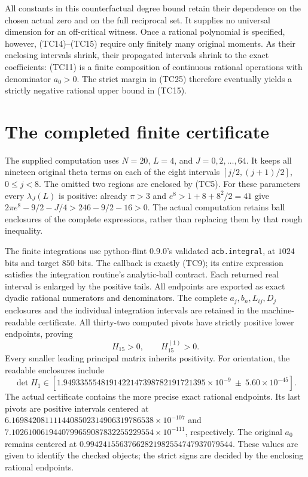 \documentclass[11pt]{article}
\begin{document}
All constants in this counterfactual degree bound retain their
dependence on the chosen actual zero and on the full reciprocal
set. It supplies no universal dimension for an off-critical
witness. Once a rational polynomial is specified, however,
(TC14)--(TC15) require only finitely many original moments.
As their enclosing intervals shrink, their propagated intervals
shrink to the exact coefficients: (TC11) is a finite composition
of continuous rational operations with denominator $a_0>0$.
The strict margin in (TC25) therefore eventually yields a strictly
negative rational upper bound in (TC15).

\section{The completed finite certificate}
The supplied computation uses $N=20$, $L=4$, and $J=0,2,\ldots,64$.
It keeps all nineteen original theta terms on each of the eight
intervals $[j/2,(j+1)/2]$, $0\le j<8$. The omitted two regions
are enclosed by (TC5). For these parameters every
$\lambda_J(L)$ is positive: already $\pi>3$ and
$e^8>1+8+8^2/2=41$ give
$2\pi e^8-9/2-J/4>246-9/2-16>0$.
The actual computation retains ball enclosures of the complete
expressions, rather than replacing them by that rough inequality.

The finite integrations use python-flint 0.9.0's validated
\texttt{acb.integral}, at $1024$ bits and target $850$ bits.
The callback is exactly (TC9); its entire expression satisfies
the integration routine's analytic-ball contract. Each returned
real interval is enlarged by the positive tails. All endpoints
are exported as exact dyadic rational numerators and denominators.
The complete $a_j,b_n,L_{ij},D_j$ enclosures and the individual
integration intervals are retained in the machine-readable
certificate. All thirty-two computed pivots have strictly
positive lower endpoints, proving
\[
H_{15}>0,\qquad H_{15}^{(1)}>0.
\tag{TC27}
\]
Every smaller leading principal matrix inherits positivity.
For orientation, the readable enclosures include
\[
\det H_1\in
\left[1.9493355548191422147398782191721395\times10^{-9}
\ \mathbin{\pm}\ 5.60\times10^{-45}\right].
\tag{TC28}
\]
The actual certificate contains the more precise exact rational
endpoints. Its last pivots are positive intervals centered at
$6.1698420811114408502314906319786538\times10^{-107}$
and
$7.1026100619440799659087832255229554\times10^{-111}$,
respectively. The original $a_0$ remains centered at
$0.99424155637662821982554747937079544$.
These values are given to identify the checked objects; the
strict signs are decided by the enclosing rational endpoints.
\end{document}
